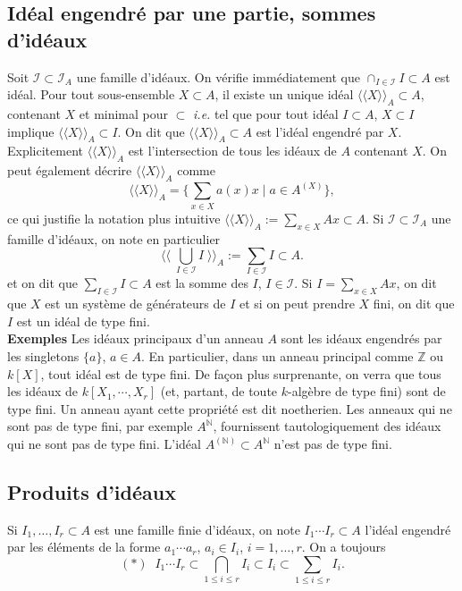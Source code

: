 \documentclass[a4paper, oneside, 12pt]{book}
\theoremstyle{definition} %
\newcommand{\ie}{\textit{i.e.}} %
\newcommand{\Z}{\mathbb{Z}}
\newcommand{\N}{\mathbb{N}}
\begin{document}
\subsection{Idéal engendré par une partie, sommes d'idéaux}Soit $\mathcal{I}\subset \mathcal{I}_A$ une famille d'idéaux. On vérifie immédiatement que $\cap_{I\in \mathcal{I}}I\subset A$ est idéal. Pour tout sous-ensemble $X\subset A$, il existe 
un unique idéal $\langle\langle X\rangle\rangle_A \subset A$, contenant $X$ et minimal pour $\subset$ \ie{} tel que pour  tout idéal $I\subset A$,   $X\subset I$ implique  $\langle\langle X\rangle\rangle_A\subset I$. On dit que $\langle\langle X\rangle\rangle_A\subset A$ est l'idéal engendré par $X$. Explicitement $\langle\langle X\rangle\rangle_A$ est l'intersection de tous les idéaux de $A$ contenant $X$. On peut également décrire $\langle\langle X\rangle\rangle_A$ comme  
$$\langle\langle X\rangle\rangle_A=\lbrace \sum_{x\in X}a(x)x\;|\; a \in A^{(X)}\rbrace,$$
ce qui justifie la notation plus intuitive $\langle\langle X\rangle\rangle_A:=\sum_{x\in X}Ax\subset A$. Si  $\mathcal{I}\subset \mathcal{I}_A$ une famille d'idéaux, on note en particulier $$ \langle\langle\; \bigcup_{I\in \mathcal{I}}I\;  \rangle\rangle_A :=\sum_{I\in \mathcal{I}}I\subset A.$$ et on dit que $\sum_{I\in \mathcal{I}}I\subset A$ est la somme des $I$, $I\in \mathcal{I}$. Si  $I=\sum_{x\in X} Ax$, on dit que $X$ est un système de générateurs de $I$ et si on peut prendre $X$ fini, on dit que $I$ est un idéal de type fini.\\

\textbf{Exemples}  Les idéaux principaux d'un anneau $A$ sont les idéaux engendrés par les singletons $\lbrace a\rbrace$, $a\in A$. En particulier, dans un anneau principal comme $\Z$ ou $k[X]$, tout idéal est de type fini.  De fa\c{c}on plus surprenante, on verra que tous les idéaux de $k[X_1,\cdots, X_r]$ (et, partant, de toute $k$-algèbre de type fini) sont de type fini. Un anneau ayant cette propriété est dit noetherien. Les anneaux qui ne sont pas de type fini, par exemple $A^\N$, fournissent tautologiquement des idéaux qui ne sont pas de type fini. L'idéal $A^{(\N)}\subset A^\N$ n'est pas de type fini.\\
 

\subsection{Produits d'idéaux}Si $I_1,\dots, I_r\subset A$ est une famille finie d'idéaux, on note $I_1\cdots I_r\subset A$ l'idéal engendré par les éléments de la forme $a_1\cdots a_r$, $a_i\in I_i$, $i=1,\dots, r$. On a toujours $$(*)\;\; I_1\cdots I_r\subset \displaystyle{\bigcap_{1\leq i\leq r}I_i}\subset I_i\subset \sum_{1\leq i\leq r} I_i.$$ 
\end{document}
